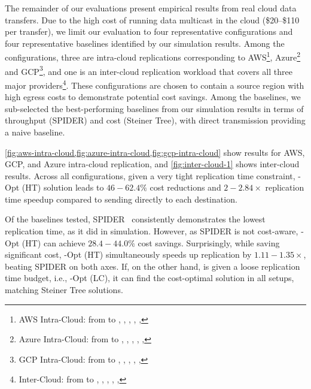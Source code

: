 The remainder of our evaluations present empirical results from real cloud data transfers.
Due to the high cost of running data multicast in the cloud (\$20--\$110 per transfer), we limit our evaluation to four representative configurations and four representative baselines identified by our simulation results.
Among the configurations, three are intra-cloud replications corresponding to AWS\footnote{AWS Intra-Cloud: from  to , , , , , }, Azure\footnote{Azure Intra-Cloud: from  to , , , , , } and GCP\footnote{GCP Intra-Cloud: from  to , , , , , }, and one is an inter-cloud replication workload that covers all three major providers\footnote{Inter-Cloud: from  to , , , , , }.
These configurations are chosen to contain a source region with high egress costs to demonstrate potential cost savings.
Among the baselines, we sub-selected the best-performing baselines from our simulation results in terms of throughput (SPIDER) and cost (Steiner Tree), with direct transmission providing a naive baseline.


\cref{fig:aws-intra-cloud,fig:azure-intra-cloud,fig:gcp-intra-cloud} show results for AWS, GCP, and Azure intra-cloud replication, and \cref{fig:inter-cloud-1} shows inter-cloud results.
Across all configurations, given a very tight replication time constraint, \sys{}-Opt (HT) solution leads to $46-62.4\%$ cost reductions and $2-2.84\times$ replication time speedup compared to sending directly to each destination. 

Of the baselines tested, SPIDER~\cite{ganguly2005fast} consistently demonstrates the lowest replication time, as it did in simulation.
However, as SPIDER is not cost-aware, \sys{}-Opt (HT) can achieve $28.4-44.0\%$ cost savings.
Surprisingly, while saving significant cost, \sys{}-Opt (HT) simultaneously speeds up replication by $1.11-1.35\times$, beating SPIDER on both axes.
If, on the other hand, 
\sys is given a loose replication time budget, i.e., \sys{}-Opt (LC), it can find the cost-optimal solution in all setups, matching Steiner Tree solutions.

